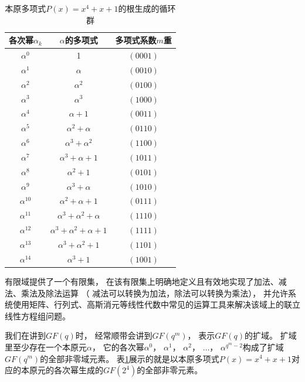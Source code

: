 \begin{table}[htbp]
	\centering
	\caption{本原多项式$P\left(x\right)=x^{4}+x+1$的根生成的循环群}
	\begin{tabularx}{250pt}{c|c|c}
		\toprule
		\textbf{各次幂$\alpha_{k}$} & \textbf{$\alpha$的多项式}&\textbf{多项式系数$m$重}\\
		\midrule
		$\alpha^{0}$ & 1 &$\left(0001\right)$\\
		\hline
		$\alpha^{1}$ & $\alpha$ &$\left(0010\right)$\\
		\hline
		$\alpha^{2}$ & $\alpha^{2}$ & $\left(0100\right)$\\
		\hline
		$\alpha^{3}$ & $\alpha^{3}$ & $\left(1000\right)$\\
		\hline
		$\alpha^{4}$ & $\alpha+1$ & $\left(0011\right)$\\
		\hline
		$\alpha^{5}$ & $\alpha^{2}+\alpha$ & $\left(0110\right)$\\
		\hline
		$\alpha^{6}$ & $\alpha^{3}+\alpha^{2}$ & $\left(1100\right)$\\
		\hline
		$\alpha^{7}$ & $\alpha^{3}+\alpha+1$ & $\left(1011\right)$\\
		\hline
		$\alpha^{8}$ & $\alpha^{2}+1$ & $\left(0101\right)$\\
		\hline
		$\alpha^{9}$ & $\alpha^{3}+\alpha$ & $\left(1010\right)$\\
		\hline
		$\alpha^{10}$ & $\alpha^{2}+\alpha+1$ & $\left(0111\right)$\\
		\hline
		$\alpha^{11}$ & $\alpha^{3}+\alpha^{2}+\alpha$ & $\left(1110\right)$\\
		\hline
		$\alpha^{12}$ & $\alpha^{3}+\alpha^{2}+\alpha+1$ & $\left(1111\right)$\\
		\hline
		$\alpha^{13}$ & $\alpha^{3}+\alpha^{2}+1$ & $\left(1101\right)$\\
		\hline
		$\alpha^{14}$ & $\alpha^{3}+1$ & $\left(1001\right)$\\
		\hline
	\end{tabularx}
	\label{SHUYU}
\end{table}
\par
有限域提供了一个有限集，
在该有限集上明确地定义且有效地实现了加法、减法、乘法及除法运算
（ 减法可以转换为加法，除法可以转换为乘法），
并允许系统使用矩阵、行列式、高斯消元等线性代数中常见的运算工具来解决该域上的联立线性方程组问题。
\par
我们在讲到$GF\left(q\right)$时，
经常顺带会讲到$GF\left(q^{m}\right)$，
表示$GF\left(q\right)$的扩域。
扩域里至少存在一个本原元$\alpha$，
它的各次幂$\alpha^{0}$，
$\alpha^{1}$，
$\alpha^{2}$，
$\dots$，
$\alpha^{q^{m}-2}$构成了扩域$GF\left(q^{m}\right)$的全部非零域元素。
表\ref{SHUYU}展示的就是以本原多项式$P\left(x\right)=x^{4}+x+1$对应的本原元的各次幂生成的$GF\left(2^4\right)$的全部非零元素。
